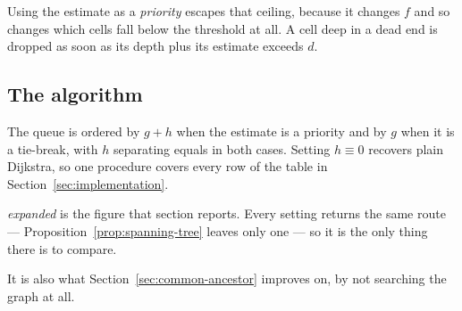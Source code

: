 Using the estimate as a \emph{priority} escapes that ceiling, because it changes
$f$ and so changes which cells fall below the threshold at all. A cell deep in a
dead end is dropped as soon as its depth plus its estimate exceeds $d$.

\subsection{The algorithm}

\begin{algorithm}[H]
\caption{Shortest route to the exit, with an estimate as guide.}
\label{alg:search}
\BlankLine
{}
\end{algorithm}

The queue is ordered by $g+h$ when the estimate is a priority and by $g$ when it
is a tie-break, with $h$ separating equals in both cases. Setting $h\equiv0$
recovers plain Dijkstra, so one procedure covers every row of the table in
Section~\ref{sec:implementation}.

\emph{expanded} is the figure that section reports. Every setting returns the
same route --- Proposition~\ref{prop:spanning-tree} leaves only one --- so it is
the only thing there is to compare.

It is also what Section~\ref{sec:common-ancestor} improves on, by not searching
the graph at all.
